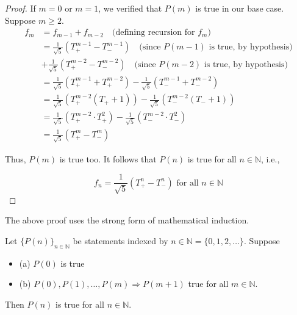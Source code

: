 \documentclass[11pt, draft]{article}
\begin{document}
\begin{enumerate}
\begin{proof}
              If $m = 0$ or $m = 1$, we verified that $P(m)$ is true in our base case.
              Suppose $m \geq 2$.
              \[
                  \begin{aligned}
                      f_m & = f_{m-1} + f_{m-2} \quad \text{(defining recursion for } f_m\text{)}                                                 \\
                          & = \frac{1}{\sqrt{5}} \left( T_+^{m-1} - T_-^{m-1} \right) \quad \text{(since } P(m-1) \text{ is true, by hypothesis)} \\
                          & + \frac{1}{\sqrt{5}} \left( T_+^{m-2} - T_-^{m-2} \right) \quad \text{(since } P(m-2) \text{ is true, by hypothesis)} \\
                          & = \frac{1}{\sqrt{5}} \left( T_+^{m-1} + T_+^{m-2} \right) - \frac{1}{\sqrt{5}} \left( T_-^{m-1} + T_-^{m-2} \right)   \\
                          & = \frac{1}{\sqrt{5}} \left( T_+^{m-2} (T_+ + 1) \right) - \frac{1}{\sqrt{5}} \left( T_-^{m-2} (T_- + 1) \right)       \\
                          & = \frac{1}{\sqrt{5}} \left( T_+^{m-2} \cdot T_+^2 \right) - \frac{1}{\sqrt{5}} \left( T_-^{m-2} \cdot T_-^2 \right)   \\
                          & = \frac{1}{\sqrt{5}} \left( T_+^m - T_-^m \right)
                  \end{aligned}
              \]

              Thus, $P(m)$ is true too. It follows that $P(n)$ is true for all $n \in
                  \mathbb{N}$, i.e.,

              \[
                  f_n = \frac{1}{\sqrt{5}} \left( T_+^n - T_-^n \right) \text{ for all } n \in \mathbb{N}
              \]
          \end{proof}
          The above proof uses the strong form of mathematical induction.
\end{enumerate}
\begin{theorem} 
    Let $\{P(n)\}_{n \in \mathbb{N}}$ be statements indexed by $n \in \mathbb{N} = \{0, 1, 2, \ldots\}$. Suppose
    \begin{itemize}
        \item (a) $P(0)$ is true
        \item (b) $P(0), P(1), \ldots, P(m) \Rightarrow P(m+1)$ true for all $m \in \mathbb{N}$.
    \end{itemize}

    Then $P(n)$ is true for all $n \in \mathbb{N}$.
\end{theorem}
\end{document}
